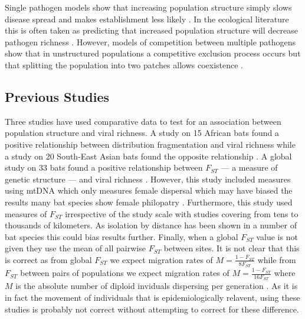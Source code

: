 Single pathogen models show that increasing population structure simply slows disease spread and makes establishment less likely \cite{colizza2007invasion, vespignani2008reaction}.
In the ecological literature this is often taken as predicting that increased population structure will decrease pathogen richness \cite{nunn2003comparative}.
However, models of competition between multiple pathogens show that in unstructured populations a competitive exclusion process occurs but that splitting the population into two patches allows coexistence \cite{qiu2013vector,allen2004sis, nunes2006localized}.


\subsection{Previous Studies}

Three studies have used comparative data to test for an association between population structure and viral richness.
A study on 15 African bats found a positive relationship between distribution fragmentation and viral richness \cite{maganga2014bat} while a study on 20 South-East Asian bats found the opposite relationship \cite{gay2014parasite}. 
A global study on 33 bats found a positive relationship between $F_{ST}$ --- a measure of genetic structure --- and viral richness \cite{turmelle2009correlates}. 
However, this study included measures using mtDNA which only measures female dispersal which may have biased the results many bat species show female philopatry \cite{kerth2002extreme, hulva2010mechanisms}.
Furthermore, this study used measures of $F_{ST}$ irrespective of the study scale with studies covering from tens \cite{mccracken1981social} to thousands \cite{petit1999male} of kilometers.
As isolation by distance has been shown in a number of bat species \cite{burland1999population, hulva2010mechanisms, o2015genetic, vonhof2015range} this could bias results further.
Finally, when a global $F_{ST}$ value is not given they use the mean of all pairwise $F_{ST}$ between sites.
It is not clear that this is correct as from global $F_{ST}$ we expect migration rates of $M = \frac{1-F_{ST}}{8F_{ST}}$ while from $F_{ST}$ between pairs of populations we expect migration rates of $M = \frac{1-F_{ST}}{16F_{ST}}$ where $M$ is the absolute number of diploid inviduals dispersing per generation \cite{slatkin1995measure}.
As it is in fact the movement of individuals that is epidemiologically relavent, using these studies is probably not correct without attempting to correct for these difference.

